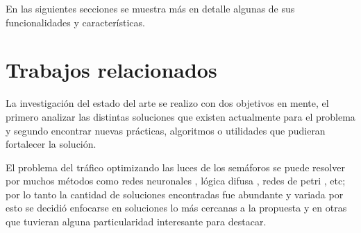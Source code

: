 En las siguientes secciones se muestra más en detalle algunas de sus funcionalidades y características.





\section{Trabajos relacionados}

La investigación del estado del arte se realizo con dos objetivos en mente, el primero analizar las distintas soluciones que existen actualmente para el problema y segundo encontrar nuevas prácticas, algoritmos o utilidades que pudieran fortalecer la solución.

El problema del tráfico optimizando las luces de los semáforos se puede resolver por muchos métodos como  redes neuronales \citep{Lopez1999}, lógica difusa \citep{Lim2001}, redes de petri \citep{DiFebbraro2002}, etc; por lo tanto la cantidad de soluciones encontradas fue abundante y variada por esto se decidió enfocarse en soluciones lo más cercanas a la propuesta y en otras que tuvieran alguna particularidad interesante para destacar.


